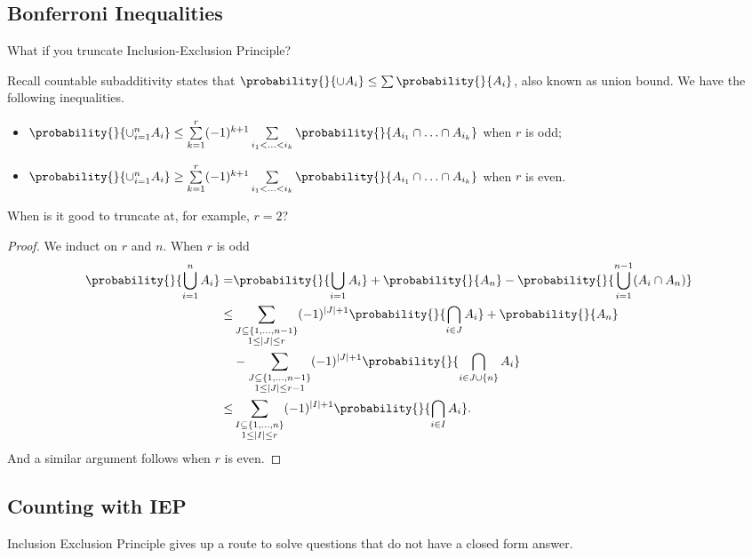 \subsection{Bonferroni Inequalities}
\begin{problem}
    What if you truncate Inclusion-Exclusion Principle?
\end{problem}
Recall countable subadditivity states that \(\probability{}{\cup A_i}\leq \sum \probability{}{A_i} \), also known as union bound. We have the following inequalities.
\begin{itemize}
    \item \(\probability{}{\cup_{i=1}^n A_i} \leq \sum\limits_{k=1}^{r} (-1)^{k+1}\sum\limits_{i_1 < \ldots < i_k}\probability{}{A_{i_1}\cap \ldots \cap A_{i_k} } \) when \(r\) is odd;
    \item \(\probability{}{\cup_{i=1}^n A_i} \geq \sum\limits_{k=1}^{r} (-1)^{k+1}\sum\limits_{i_1 < \ldots < i_k}\probability{}{A_{i_1}\cap \ldots \cap A_{i_k} } \) when \(r\) is even.
\end{itemize}
\begin{problem}
    When is it good to truncate at, for example, \(r = 2\)?
\end{problem}
\begin{proof}
    We induct on \(r\) and \(n\). When \(r\) is odd
     \begin{align*}
         \probability{}{\bigcup_{i=1}^n A_i} =& \probability{}{\bigcup_{i = 1} A_i} + \probability{}{A_n} - \probability{}{\bigcup_{i=1}^{n-1}(A_i \cap A_n)}\\
         \leq& \sum\limits_{\substack{J\subseteq \{1, \ldots , n - 1\}\\1 \leq  \left\vert J \right\vert \leq r }} (-1)^{\left\vert J \right\vert +1}\probability{}{\bigcap_{i\in J} A_i}+\probability{}{A_n} \\
         &- \sum\limits_{\substack{J\subseteq \{1, \ldots , n - 1\}\\1 \leq  \left\vert J \right\vert \leq r -1}} (-1)^{\left\vert J \right\vert +1}\probability{}{\bigcap_{i\in J \cup \{n\}} A_i}\\
         \leq& \sum\limits_{\substack{I\subseteq \{1, \ldots , n\}\\1 \leq  \left\vert I \right\vert \leq r }} (-1)^{\left\vert I \right\vert +1}\probability{}{\bigcap_{i\in I} A_i}.
     \end{align*}
     And a similar argument follows when \(r\) is even.
\end{proof}
\subsection{Counting with IEP}
Inclusion Exclusion Principle gives up a route to solve questions that do not have a closed form answer.

